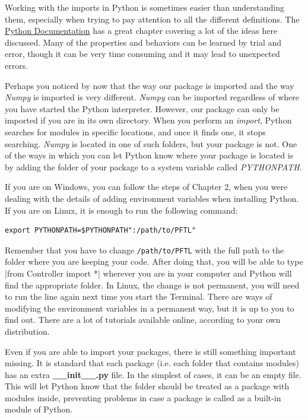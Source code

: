 
Working with the imports in Python is sometimes easier than understanding them, especially when trying to pay attention to all the different definitions. The \href{https://docs.python.org/3.6/tutorial/modules.html}{Python Documentation} has a great chapter covering a lot of the ideas here
discussed. Many of the properties and behaviors can be learned by trial and error, though it can be very time consuming and it may lead to unexpected errors.

Perhaps you noticed by now that the way our package is imported and the way \emph{Numpy} is imported is very different. \emph{Numpy} can be
imported regardless of where you have started the Python interpreter. However, our package can only be imported if you are in its own directory. When you perform an \emph{import}, Python searches for modules in specific locations, and once it finds one, it stops searching. \emph{Numpy} is located in one of such folders, but your package is not. One of the ways in which you can let Python know where your package is located is by adding the folder of your package to a system variable called \emph{PYTHONPATH}.

If you are on Windows, you can follow the steps of Chapter 2, when you were dealing with the details of adding environment variables when
installing Python. If you are on Linux, it is enough to run the following command:

\begin{verbatim}
export PYTHONPATH=$PYTHONPATH":/path/to/PFTL"
\end{verbatim}

Remember that you have to change \texttt{/path/to/PFTL} with the full path to the folder where you are keeping your code. After doing that, you will be able to type |from Controller import *| wherever you are in your computer and Python will find the appropriate folder. In Linux, the change is not permanent, you will need to run the line again next time you start the Terminal. There are ways of modifying the environment variables in a permanent way, but it is up to you to find out. There are a lot of tutorials available online, according to your own distribution. 

Even if you are able to import your packages, there is still something important missing. It is standard that each package (i.e. each folder that contains modules) has an extra \textbf{\_\_init\_\_.py} file. In the simplest of cases, it can be an empty file. This will let Python know that the folder should be treated as a package with modules inside, preventing problems in case a package is called as a built-in module of Python. 

